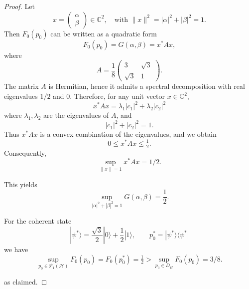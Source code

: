 \documentclass[12pt, reco]{article}
\begin{document}
\begin{proof}
Let
\[
x =
\begin{pmatrix}
\alpha \\
\beta
\end{pmatrix}
\in \mathbb{C}^2,
\quad \text{with } \|x\|^2 = |\alpha|^2 + |\beta|^2 = 1.
\]
Then \(F_0(p_0)\) can be written as a quadratic form
\[
F_0(p_0)=G(\alpha,\beta) = x^* A x,
\]
where
\[
A =
\frac{1}{8}
\begin{pmatrix}
3 & \sqrt{3} \\
\sqrt{3} & 1
\end{pmatrix}.
\]
The matrix \(A\) is Hermitian, hence it admits a spectral decomposition with real eigenvalues  \(1/2\) and \(0\). Therefore, for any unit vector \(x \in \mathbb{C}^2\),
\[
x^* A x = \lambda_1 |c_1|^2 + \lambda_2 |c_2|^2
\]
where \(\lambda_1,\lambda_2\) are the eigenvalues of \(A\), and
\[
|c_1|^2 + |c_2|^2 = 1.
\]
Thus \(x^* A x\) is a convex combination of the eigenvalues, and we obtain
\[
0
\le x^* A x
\le \tfrac{1}{2}.
\]
Consequently,
\[
\sup_{\|x\|=1} x^* A x = 1/2.
\]

This yields
\[
\sup_{|\alpha|^2 + |\beta|^2 = 1} G(\alpha,\beta) = \frac{1}{2}.
\]

For the coherent state
$$
|\psi^*\rangle
=
\frac{\sqrt{3}}{2}|0\rangle + \frac{1}{2}|1\rangle,
\qquad
p_0^* = |\psi^*\rangle\langle\psi^*|
$$
we have
\[
\sup_{p_0\in\mathcal{P}_1(\mathcal{H})} F_0(p_0)=F_0(p_0^*)
  = \tfrac{1}{2} > \sup_{p_0\in D_H} F_0(p_0) = 3/8.
\]

as claimed.

\end{proof}
\end{document}
